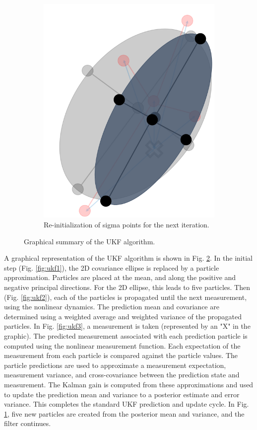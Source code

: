 \begin{figure}[h!]
\begin{subfigure}[b]{0.35\textwidth}
	\includegraphics[width=\linewidth]{./ukf4}
	\caption{Re-initialization of sigma points for the next iteration.}
	\label{fig:ukf4}
	\end{subfigure}
	\caption{Graphical summary of the UKF algorithm.}
	\label{fig:ukf_summary}
\end{figure}

A graphical representation of the UKF algorithm is shown in Fig. \ref{fig:ukf_summary}.
In the initial step (Fig. \ref{fig:ukf1}), the 2D covariance ellipse is replaced by a particle approximation.
Particles are placed at the mean, and along the positive and negative principal directions.
For the 2D ellipse, this leads to five particles.
Then (Fig. \ref{fig:ukf2}), each of the particles is propagated until the next measurement, using the nonlinear dynamics.
The prediction mean and covariance are determined using a weighted average and weighted variance of the propagated particles.
In Fig. \ref{fig:ukf3}, a measurement is taken (represented by an "X" in the graphic).
The predicted measurement associated with each prediction particle is computed using the nonlinear measurement function.
Each expectation of the measurement from each particle is compared against the particle values.
The particle predictions are used to approximate a measurement expectation, measurement variance, and cross-covariance between the prediction state and measurement.
The Kalman gain is computed from these approximations and used to update the prediction mean and variance to a posterior estimate and error variance.
This completes the standard UKF prediction and update cycle.
In Fig. \ref{fig:ukf4}, five new particles are created from the posterior mean and variance, and the filter continues.

